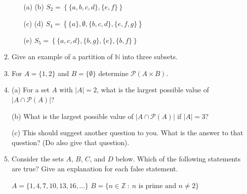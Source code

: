 \documentclass[12pt]{article}
\newcommand{\NN}{{\mathbb N}}  %
\newcommand{\ZZ}{{\mathbb Z}}  %
\newcommand{\calP}{{\mathcal P}}  %
\newcommand{\sep}{{\ :\ }}     %
\begin{document}
\begin{enumerate}
\begin{enumerate}
  \item[(a)] 
        (b)                     $S_2=\left\{ \{a,b,c,d\},\{e,f\} \right\}$
  \item[(c)] 
        (d)                     $S_4=\left\{ \{a\}, \emptyset, \{b,c,d\},\{e,f,g\} \right\}$
  \item[(e)]  $S_5=\left\{ \{a,c,d\},\{b,g\},\{e\},\{b,f\} \right\}$
    
  \end{enumerate}

\item Give an example of a partition of $\NN$ into three subsets.


\item   For $A=\{1,2\}$ and $B=\{\emptyset\}$ determine $\calP(A\times B)$.

\item
  (a) For a set $A$ with $|A|=2$, what is the largest possible value of $|A\cap\calP(A)|$?

  (b) What is the largest possible value of  $|A\cap\calP(A)|$ if $|A|=3$?

  (c) This should suggest another question to you.
      What is the answer to that question?  \newline (Do also give that question).

\item  Consider the sets $A$, $B$, $C$, and $D$ below.
       Which of the following statements are true?      
       Give an explanation for each false statement.

       $A = \{1,4,7,10,13,16,\dotsc\}$ \qquad $B=\{n\in\ZZ\sep n\mbox{ is prime and }n\neq 2\}$


\end{enumerate}
\end{document}

